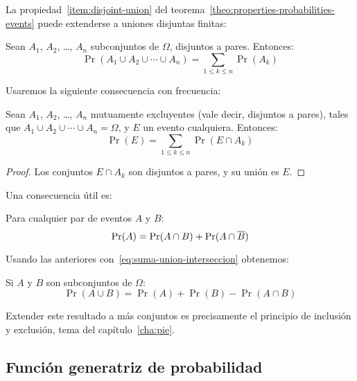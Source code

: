   La propiedad~\ref{item:disjoint-union}
  del teorema~\ref{theo:properties-probabilities-events}
  puede extenderse a uniones disjuntas finitas:
  \begin{theorem}
    \label{theo:disjoint-events}
    Sean \(A_1\), \(A_2\), \ldots, \(A_n\)
    subconjuntos de \(\Omega\),
    disjuntos a pares.
    Entonces:
    \begin{equation*}
      \Pr(A_1 \cup A_2 \cup \dotsb \cup A_n)
	= \sum_{1 \le k \le n} \Pr(A_k)
    \end{equation*}
  \end{theorem}
  Usaremos la siguiente consecuencia con frecuencia:%
  \begin{corollary}
    \label{cor:disjoint-events-intersection}
    Sean \(A_1\), \(A_2\), \ldots, \(A_n\)
    mutuamente excluyentes
    (vale decir,
     disjuntos a pares),
    tales que \(A_1 \cup A_2 \cup \dotsb \cup A_n = \Omega\),
    y \(E\) un evento cualquiera.
    Entonces:
    \begin{equation*}
      \Pr(E)
	= \sum_{1 \le k \le n} \Pr(E \cap A_k)
    \end{equation*}
  \end{corollary}
  \begin{proof}
    Los conjuntos \(E \cap A_k\) son disjuntos a pares,
    y su unión es \(E\).
  \end{proof}
  Una consecuencia útil es:
  \begin{corollary}
    \label{cor:event-intersection-and-complement}
    Para cualquier par de eventos \(A\) y \(B\):
    \begin{equation*}
      \Pr(A)
	= \Pr(A \cap B) + \Pr(A \cap \overline{B})
      \qedhere
    \end{equation*}
  \end{corollary}
  Usando las anteriores con~\eqref{eq:suma-union-interseccion}
  obtenemos:
  \begin{theorem}
    \label{theo:probability-union}
    Si \(A\) y \(B\) son subconjuntos de \(\Omega\):
    \begin{equation*}
      \Pr(A \cup B)
	= \Pr(A) + \Pr(B) - \Pr(A \cap B)
    \end{equation*}
  \end{theorem}
  Extender este resultado a más conjuntos
  es precisamente el principio de inclusión y exclusión,
  tema del capítulo~\ref{cha:pie}.

\subsection{Función generatriz de probabilidad}
\label{sec:PGF}

